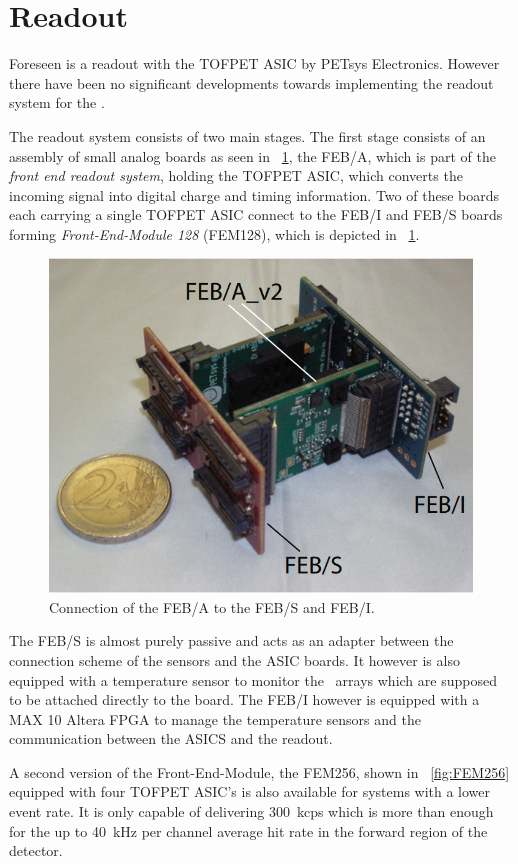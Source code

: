 \documentclass[../BTOF_summary.tex]{subfiles}
\begin{document}
\section{Readout}

Foreseen is a readout with the TOFPET ASIC by PETsys Electronics.
However there have been no significant developments towards implementing the readout system for the \btofD .

The readout system consists of two main stages.
The first stage consists of an assembly of small analog boards as seen in \fig~\ref{fig:FEM128}, the FEB/A, which is part of the \textit{front end readout system}, holding the TOFPET ASIC, which converts the incoming signal into digital charge and timing information.
Two of these boards each carrying a single TOFPET ASIC connect to the FEB/I and FEB/S boards forming \textit{Front-End-Module 128} (FEM128), which is depicted in \fig~\ref{fig:FEM128}.

\begin{figure}[htbp]
    \centering
    \includegraphics*[width=.8\textwidth]{fig/FEB_A_I_S.png}
    \caption{Connection of the FEB/A to the FEB/S and FEB/I.}
    \label{fig:FEM128}
\end{figure}

The FEB/S is almost purely passive and acts as an adapter between the connection scheme of the sensors and the ASIC boards.
It however is also equipped with a temperature sensor to monitor the \sipms\ arrays which are supposed to be attached directly to the board.
The FEB/I however is equipped with a MAX 10 Altera FPGA to manage the temperature sensors and the communication between the ASICS and the readout.

A second version of the Front-End-Module, the FEM256, shown in \fig~\ref{fig:FEM256} equipped with four TOFPET ASIC's is also available for systems with a lower event rate.
It is only capable of delivering \SI{300}{kcps} which is more than enough for the up to \SI{40}{kHz} per channel average hit rate in the forward region of the detector.
\end{document}
